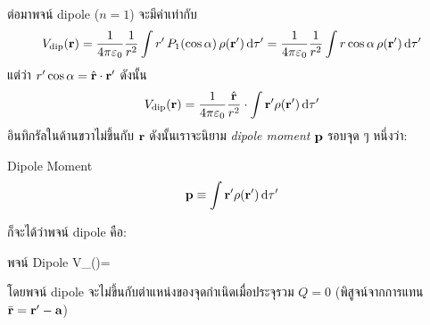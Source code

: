ต่อมาพจน์ dipole ($n=1$) จะมีค่าเท่ากับ
\[
V_\txt{dip}(\vb{r})=\kem\frac{1}{r^2}\int r'\,P_1(\cos\alpha)\,\rho(\vb{r}')\odif{\tau'}=\kem\frac{1}{r^2}\int r\cos\alpha\,\rho(\vb{r}')\odif{\tau'}
\]
แต่ว่า $r'\cos\alpha=\hat{\mathbf{r}}\cdot\mathbf{r}'$ ดังนั้น
\[
V_\txt{dip}(\vb{r})=\kem\frac{\vu{r}}{r^2}\cdot\int\vb{r}'\rho(\vb{r}')\odif{\tau'}
\]
อินทิกรัลในด้านขวาไม่ขึ้นกับ $\mathbf{r}$ ดังนั้นเราจะนิยาม \emph{dipole moment} $\mathbf{p}$ รอบจุด ๆ หนึ่งว่า:
\begin{defbox}{ Dipole Moment}
    \begin{equation}
        \vb{p}\equiv\int\vb{r}'\rho(\vb{r}')\odif{\tau'}
    \end{equation}
\end{defbox}
ก็จะได้ว่าพจน์ dipole คือ:
\begin{eqbox}{พจน์ Dipole}
    V_()=\kem{}\label{dippotential}
\end{eqbox}
โดยพจน์ dipole จะไม่ขึ้นกับตำแหน่งของจุดกำเนิดเมื่อประจุรวม $Q=0$ (พิสูจน์จากการแทน $\bar{\mathbf{r}}=\mathbf{r}'-\mathbf{a}$)
